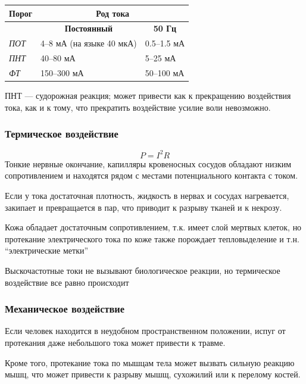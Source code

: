 \documentclass[a4paper, 14pt]{extarticle}
\begin{document}
\begin{table}[h]
\centering
\begin{tabular}{@{}lll@{}}
\toprule
\textbf{Порог} & \multicolumn{2}{c}{\textbf{Род тока}}                                        \\ \midrule
               & \multicolumn{1}{c}{\textbf{Постоянный}} & \multicolumn{1}{c}{\textbf{50 Гц}} \\ \midrule
\textit{ПОТ}   & 4--8 мА (на языке 40 мкА)                & 0.5--1.5 мА                         \\
\textit{ПНТ}   & 40--80 мА                                & 5--25 мА                            \\
\textit{ФТ}    & 150--300 мА                              & 50--100 мА                          \\ \bottomrule
\end{tabular}
\end{table}
ПНТ --- судорожная реакция; может привести как к прекращению воздействия тока, как и к тому, что прекратить воздействие усилие воли невозможно. 

\subsubsection{Термическое воздействие}
\[ P = I^2 R \]
Тонкие нервные окончание, капилляры кровеносных сосудов обладают низким сопротивлением и находятся рядом с местами потенциального контакта с током. 

Если у тока достаточная плотность, жидкость в нервах и сосудах нагревается, закипает и превращается в пар, что приводит к разрыву тканей и к некрозу.

Кожа обладает достаточным сопротивлением, т.к. имеет слой мертвых клеток, но протекание электрического тока по коже также порождает тепловыделение и т.н. ``электрические метки''

Выскочастотные токи не вызывают биологическое реакции, но термическое воздействие все равно происходит

\subsubsection{Механическое воздействие}
Если человек находится в неудобном пространственном положении, испуг от протекания даже небольшого тока может привести к травме.

Кроме того, протекание тока по мышцам тела может вызвать сильную реакцию мышц, что может привести к разрыву мышщ, сухожилий или к перелому костей.
\end{document}
